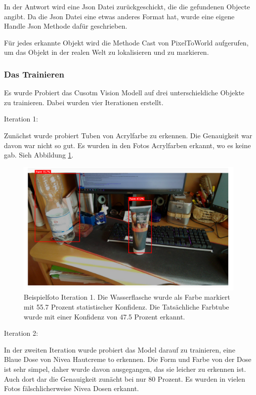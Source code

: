 \documentclass[german,a4paper, 12pt]{llncs}
\begin{document}
In der Antwort wird eine Json Datei zurückgeschickt, die die gefundenen Objecte angibt.
Da die Json Datei eine etwas anderes Format hat, wurde eine eigene Handle Json Methode dafür geschrieben.

Für jedes erkannte Objekt wird die Methode Cast von PixelToWorld aufgerufen, um das Objekt in der realen Welt zu lokalisieren und zu markieren.

\subsubsection{Das Trainieren}

Es wurde Probiert das Cusotm Vision Modell auf drei unterschieldiche Objekte zu trainieren.
Dabei wurden vier Iterationen erstellt. 

Iteration 1:

Zunächst wurde probiert Tuben von Acrylfarbe zu erkennen. Die Genauigkeit war davon war nicht so gut. Es wurden in den Fotos Acrylfarben erkannt, wo es keine gab. Sieh Abbildung \ref{image:customVisionPaint}. 

\begin{figure}[H]
	\centering
	\includegraphics[width=1.0\textwidth]{images/customVisionPaint.PNG}
	\caption[]{Beispielfoto Iteration 1. Die Wasserflasche wurde als Farbe markiert mit 55.7 Prozent statistischer Konfidenz. Die Tatsächliche Farbtube wurde mit einer Konfidenz von 47.5 Prozent erkannt.}
	\label{image:customVisionPaint}
\end{figure}

Iteration 2:

In der zweiten Iteration wurde probiert das Model darauf zu trainieren, eine Blaue Dose von Nivea Hautcreme to erkennen. Die Form und Farbe von der Dose ist sehr simpel, daher wurde davon ausgegangen, das sie leicher zu erkennen ist. Auch dort dar die Genauigkeit zunächt bei nur 80 Prozent. Es wurden in vielen Fotos fälschlicherweise Nivea Dosen erkannt.
\end{document}
